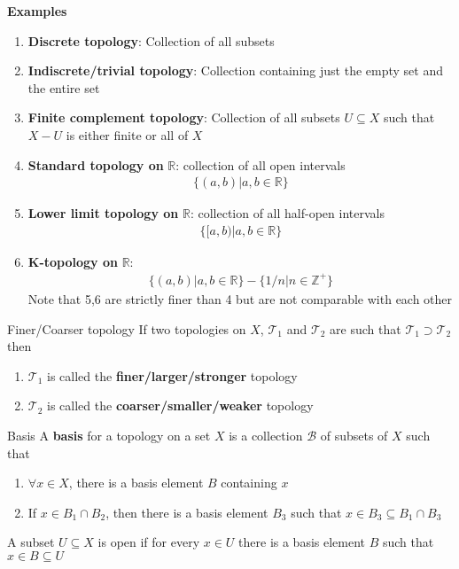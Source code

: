\documentclass[titlepage, 12pt]{article}
\begin{document}
\textbf{Examples}
\begin{enumerate}
    \item\textbf{Discrete topology}: Collection of all subsets
    \item\textbf{Indiscrete/trivial topology}: Collection containing just the
        empty set and the entire set
    \item\textbf{Finite complement topology}: Collection of all subsets
        $U\subseteq X$ such that $X - U$ is either finite or all of $X$
    \item\textbf{Standard topology on }$\mathbb{R}$: collection of all open
        intervals
        \begin{gather*}
        \{(a, b)|a, b\in\mathbb{R}\}
        \end{gather*}
    \item\textbf{Lower limit topology on }$\mathbb{R}$: collection of all
        half-open intervals
        \begin{gather*}
        \{[a, b)|a, b\in\mathbb{R}\}
        \end{gather*}
    \item\textbf{K-topology on }$\mathbb{R}$:
        \begin{gather*}
            \{(a, b)|a, b\in\mathbb{R}\} - \{1/n | n\in\mathbb{Z}^+\}
        \end{gather*}
        Note that 5,6 are strictly finer than 4 but are not comparable with each
        other
\end{enumerate}

\begin{definition}{Finer/Coarser topology}{}
    If two topologies on $X$, $\mathcal{T}_1$ and $\mathcal{T}_2$ are such that
    $\mathcal{T}_1\supset\mathcal{T}_2$ then
    \begin{enumerate}
        \item $\mathcal{T}_1$ is called the \textbf{finer/larger/stronger} topology
        \item $\mathcal{T}_2$ is called the \textbf{coarser/smaller/weaker} topology
    \end{enumerate}
\end{definition}

\begin{definition}{Basis}{}
    A \textbf{basis} for a topology on a set $X$ is a collection $\mathcal{B}$
    of subsets of $X$ such that
    \begin{enumerate}
        \item $\forall x\in X$, there is a basis element $B$ containing $x$
        \item If $x\in B_1\cap B_2$, then there is a basis element $B_3$ such
            that $x\in B_3\subseteq B_1\cap B_3$
    \end{enumerate}
    A subset $U\subseteq X$ is open if for every $x\in U$ there is a basis
    element $B$ such that $x\in B\subseteq U$
\end{definition}
\end{document}
